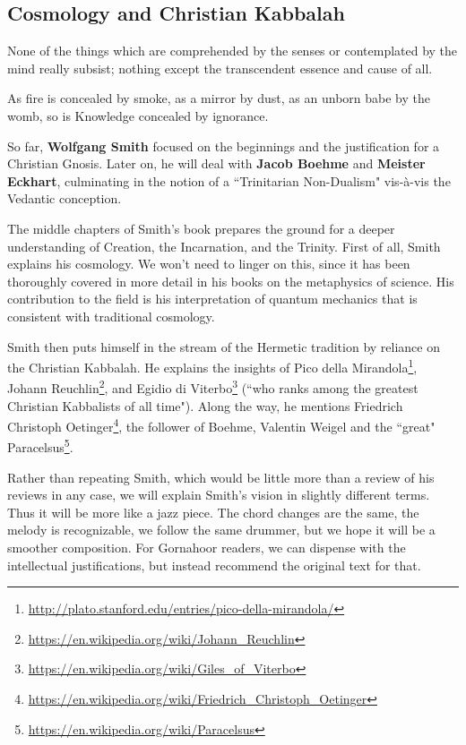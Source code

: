 \subsection{Cosmology and Christian Kabbalah}

\begin{quotex}
None of the things which are comprehended by the senses or contemplated by the mind really subsist; nothing except the transcendent essence and cause of all. 

As fire is concealed by smoke, as a mirror by dust, as an unborn babe by the womb, so is Knowledge concealed by ignorance. 

\end{quotex}
So far, \textbf{Wolfgang Smith} focused on the beginnings and the justification for a Christian Gnosis. Later on, he will deal with \textbf{Jacob Boehme} and \textbf{Meister Eckhart}, culminating in the notion of a ``Trinitarian Non-Dualism" vis-à-vis the Vedantic conception.

The middle chapters of Smith's book prepares the ground for a deeper understanding of Creation, the Incarnation, and the Trinity. First of all, Smith explains his cosmology. We won't need to linger on this, since it has been thoroughly covered in more detail in his books on the metaphysics of science. His contribution to the field is his interpretation of quantum mechanics that is consistent with traditional cosmology.

Smith then puts himself in the stream of the Hermetic tradition by reliance on the Christian Kabbalah. He explains the insights of Pico della Mirandola\footnote{\url{http://plato.stanford.edu/entries/pico-della-mirandola/}}, Johann Reuchlin\footnote{\url{https://en.wikipedia.org/wiki/Johann_Reuchlin}}, and Egidio di Viterbo\footnote{\url{https://en.wikipedia.org/wiki/Giles_of_Viterbo}} (``who ranks among the greatest Christian Kabbalists of all time"). Along the way, he mentions Friedrich Christoph Oetinger\footnote{\url{https://en.wikipedia.org/wiki/Friedrich_Christoph_Oetinger}}, the follower of Boehme, Valentin Weigel and the ``great" Paracelsus\footnote{\url{https://en.wikipedia.org/wiki/Paracelsus}}.

Rather than repeating Smith, which would be little more than a review of his reviews in any case, we will explain Smith's vision in slightly different terms. Thus it will be more like a jazz piece. The chord changes are the same, the melody is recognizable, we follow the same drummer, but we hope it will be a smoother composition. For Gornahoor readers, we can dispense with the intellectual justifications, but instead recommend the original text for that.


